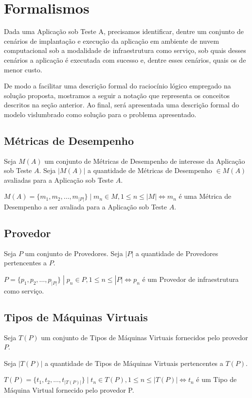 \section{Formalismos}
Dada uma Aplicação sob Teste A, precisamos identificar, dentre um conjunto de 
cenários de implantação e execução da aplicação em ambiente de nuvem 
computacional sob a modalidade de infraestrutura como serviço, sob quais desses 
cenários a aplicação é executada com sucesso e, dentre esses cenários, quais os 
de menor custo.

De modo a facilitar uma descrição formal do raciocínio lógico empregado na
solução proposta, mostramos a seguir a notação que representa os conceitos 
descritos na seção anterior. Ao final, será apresentada uma descrição formal
do modelo vislumbrado como solução para o problema apresentado.

\subsection{Métricas de Desempenho}
Seja $M(A)$ um conjunto de Métricas de Desempenho de interesse da Aplicação sob 
Teste $A$. Seja $|M(A)|$ a quantidade de Métricas de Desempenho $\in M(A)$ avaliadas 
para a Aplicação sob Teste $A$.

$M(A) = \{m_1, m_2, \dotsc, m_{|P|}\}\; | \; m_n \in M, 1 \leq n \leq |M| \iff m_n $ 
é uma Métrica de Desempenho a ser avaliada para a Aplicação sob Teste $A$.

\subsection{Provedor}
Seja $P$ um conjunto de Provedores. Seja $|P|$ a quantidade de Provedores 
pertencentes a $P$.

$P = \{p_1, p_2, \dotsc, p_{|P|}\}\; | \; p_n \in P, 1 \leq n \leq |P| \iff p_n $ 
é um Provedor de infraestrutura como serviço.

\subsection{Tipos de Máquinas Virtuais}
Seja $T(P)$ um conjunto de Tipos de Máquinas Virtuais fornecidos pelo provedor $P$.

Seja $|T(P)|$ a quantidade de Tipos de Máquinas Virtuais pertencentes a $T(P)$.

$T(P) = \{t_1, t_2, \dotsc, t_{|T(P)|}\}\; | \; t_n \in T(P), 1 \leq n \leq |T(P)|
 \iff t_n $ é um Tipo de Máquina Virtual fornecido pelo provedor P.


